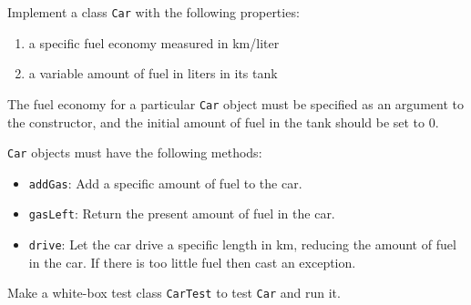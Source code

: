 \label{ex:car}
Implement a class \lstinline{Car} with the following properties:
\begin{enumerate}
\item a specific fuel economy measured in km/liter
\item a variable amount of fuel in liters in its tank
\end{enumerate}
The fuel economy for a particular \lstinline{Car} object must be specified as an argument to the constructor, and the initial amount of fuel in the tank should be set to 0.

\lstinline{Car} objects must have the following methods:
\begin{itemize}
\item \lstinline{addGas}: Add a specific amount of fuel to the car.
\item \lstinline{gasLeft}: Return the present amount of fuel in the car.
\item \lstinline{drive}: Let the car drive a specific length in km, reducing the amount of fuel in the car. If there is too little fuel then cast an exception.
\end{itemize}
Make a white-box test class \lstinline{CarTest} to test \lstinline{Car} and run it.

